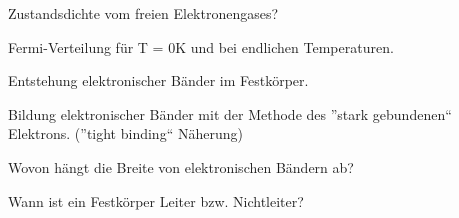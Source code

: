 \documentclass[a5paper,12pt,ngerman,print,grid=front]{kartei}
\begin{document}
	\begin{karte}{
		Zustandsdichte vom freien Elektronengases?
		}
		
		
		
	\end{karte}


	\begin{karte}{
		Fermi-Verteilung für T = 0K und bei endlichen Temperaturen.
		}
		
		
		
	\end{karte}


	\begin{karte}{
		Entstehung elektronischer Bänder im Festkörper.
		}
		
		
		
	\end{karte}


	\begin{karte}{
		Bildung elektronischer Bänder mit der Methode des ”stark gebundenen“ Elektrons. 
		(”tight binding“ Näherung)
		}
		
		
		
	\end{karte}


	\begin{karte}{
		Wovon hängt die Breite von elektronischen Bändern ab?
		}
		
		
		
	\end{karte}


	\begin{karte}{
		Wann ist ein Festkörper Leiter bzw. Nichtleiter?
		}
		
		
		
	\end{karte}

\end{document}
